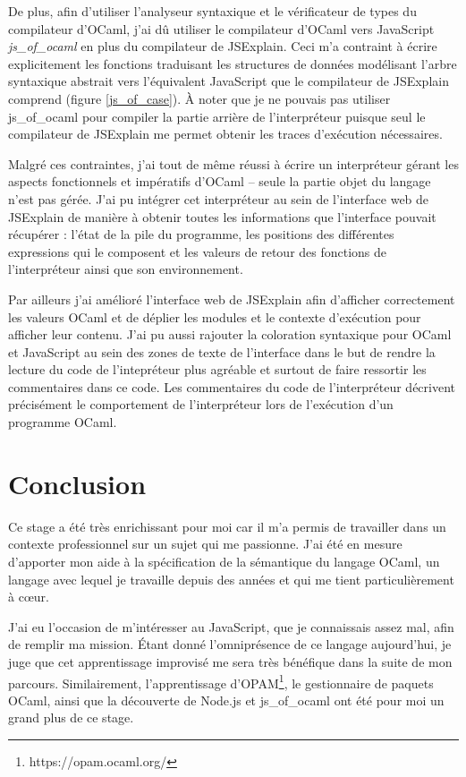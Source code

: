 \documentclass[a4paper,10pt]{article}
\begin{document}
De plus, afin d'utiliser l'analyseur syntaxique et le vérificateur de types du 
compilateur d'OCaml, j'ai dû utiliser le compilateur d'OCaml vers JavaScript 
\emph{js\_of\_ocaml} en plus du compilateur de JSExplain. Ceci m'a contraint à 
écrire explicitement les fonctions traduisant les structures de données 
modélisant l'arbre syntaxique abstrait vers l'équivalent JavaScript que le 
compilateur de JSExplain comprend (figure \ref{js_of_case}). À noter que je ne 
pouvais pas utiliser js\_of\_ocaml pour compiler la partie arrière de 
l'interpréteur puisque seul le compilateur de JSExplain me permet obtenir les 
traces d'exécution nécessaires.

Malgré ces contraintes, j'ai tout de même réussi à écrire un interpréteur 
gérant les aspects fonctionnels et impératifs d'OCaml -- seule la partie 
objet du langage n'est pas gérée. J'ai pu intégrer cet interpréteur au sein de 
l'interface web de JSExplain de manière à obtenir toutes les informations que 
l'interface pouvait récupérer : l'état de la pile du programme, les positions 
des différentes expressions qui le composent et les valeurs de retour des 
fonctions de l'interpréteur ainsi que son environnement.

Par ailleurs j'ai amélioré l'interface web de JSExplain afin d'afficher 
correctement les valeurs OCaml et de déplier les modules et le contexte 
d'exécution pour afficher leur contenu. J'ai pu aussi rajouter la coloration 
syntaxique pour OCaml et JavaScript au sein des zones de texte de l'interface 
dans le but de rendre la lecture du code de l'intepréteur plus agréable et 
surtout de faire ressortir les commentaires dans ce code. Les commentaires du 
code de l'interpréteur décrivent précisément le comportement de l'interpréteur 
lors de l'exécution d'un programme OCaml.

\section*{Conclusion}
Ce stage a été très enrichissant pour moi car il m'a permis de travailler dans 
un contexte professionnel sur un sujet qui me passionne. J'ai été en mesure 
d'apporter mon aide à la spécification de la sémantique du langage OCaml, un 
langage avec lequel je travaille depuis des années et qui me tient
particulièrement à cœur.

J'ai eu l'occasion de m'intéresser au JavaScript, que je connaissais assez mal, 
afin de remplir ma mission. Étant donné l'omniprésence de ce langage 
aujourd'hui, je juge que cet apprentissage improvisé me sera très bénéfique 
dans la suite de mon parcours. Similairement, l'apprentissage 
d'OPAM\footnote{https://opam.ocaml.org/}, le gestionnaire de paquets OCaml, 
ainsi que la découverte de Node.js et js\_of\_ocaml ont été pour moi un grand 
plus de ce stage.
\end{document}
